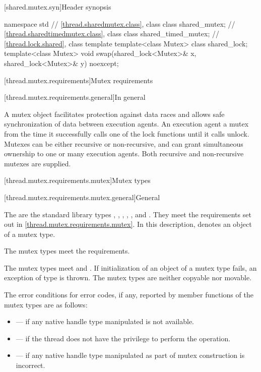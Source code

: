 [shared.mutex.syn]{Header  synopsis}

%
\begin{codeblock}
namespace std {
  // \ref{thread.sharedmutex.class}, class 
  class shared_mutex;
  // \ref{thread.sharedtimedmutex.class}, class 
  class shared_timed_mutex;
  // \ref{thread.lock.shared}, class template 
  template<class Mutex> class shared_lock;
  template<class Mutex>
    void swap(shared_lock<Mutex>& x, shared_lock<Mutex>& y) noexcept;
}
\end{codeblock}

[thread.mutex.requirements]{Mutex requirements}

[thread.mutex.requirements.general]{In general}

\pnum
A mutex object facilitates protection against data races and allows safe synchronization of
data between execution agents.
An execution agent  a mutex from the time it successfully calls one of the
lock functions until it calls unlock. Mutexes can be either recursive or non-recursive, and can
grant simultaneous ownership to one or many execution agents. Both
recursive and non-recursive mutexes are supplied.

[thread.mutex.requirements.mutex]{Mutex types}

[thread.mutex.requirements.mutex.general]{General}

\pnum
The  are the standard library types ,
, , ,
, and .
They meet the requirements set out in \ref{thread.mutex.requirements.mutex}.
In this description,  denotes an object of a mutex type.
\begin{note}
The mutex types meet the  requirements.
\end{note}

\pnum
The mutex types meet  and .
If initialization of an object of a mutex type fails,
an exception of type  is thrown.
The mutex types are neither copyable nor movable.

\pnum
The error conditions for error codes, if any, reported by member functions of the mutex types
are as follows:
\begin{itemize}
\item {} --- if any native handle type manipulated is not available.
\item {} --- if the thread does not have the
privilege to perform the operation.
\item {} --- if any native handle type manipulated as part of mutex
construction is incorrect.
\end{itemize}

